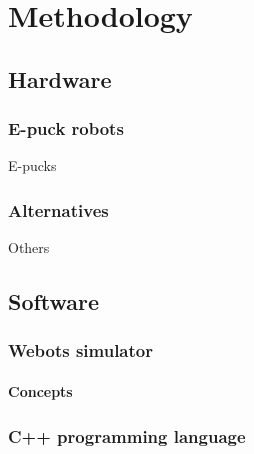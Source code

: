 \chapter{Methodology}
\label{chap:Methodology}

\section{Hardware}
\subsection{E-puck robots}
E-pucks
\subsection{Alternatives}
Others

\section{Software}
\subsection{Webots simulator}
\subsubsection{Concepts}

\subsection{C++ programming language}